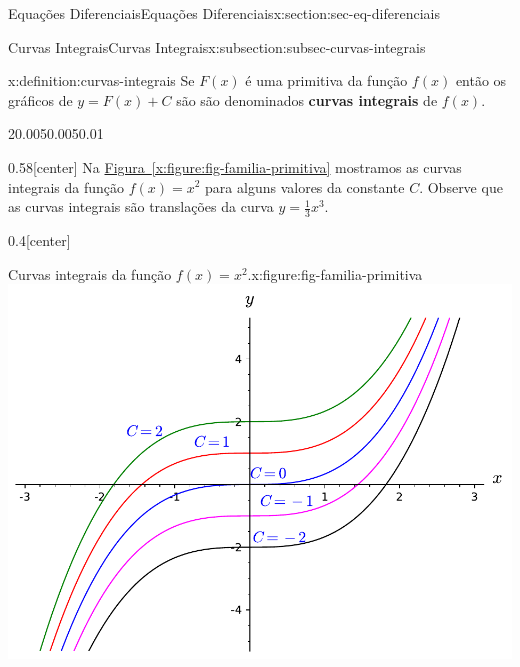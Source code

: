 \documentclass[oneside,10pt,]{article}
\newcommand{\xreffont}{\relax}
\newcommand{\terminology}[1]{\textbf{#1}}
\numberwithin{equation}{section}
\begin{document}
\begin{sectionptx}{Equações Diferenciais}{}{Equações Diferenciais}{}{}{x:section:sec-eq-diferenciais}
%
%
\typeout{************************************************}
\typeout{************************************************}
%
\begin{subsectionptx}{Curvas Integrais}{}{Curvas Integrais}{}{}{x:subsection:subsec-curvas-integrais}
\begin{definition}{}{x:definition:curvas-integrais}%
Se \(F(x)\) é uma primitiva da função \(f(x)\) então os gráficos de \(y=F(x)+C\) são são denominados  \terminology{curvas integrais} de \(f(x)\).\end{definition}
\begin{sidebyside}{2}{0.005}{0.005}{0.01}%
\begin{sbspanel}{0.58}[center]%
Na \hyperref[x:figure:fig-familia-primitiva]{Figura~{\xreffont\ref{x:figure:fig-familia-primitiva}}} mostramos as curvas integrais da função \(f(x)=x^2\) para alguns valores da constante \(C\).  Observe que as curvas integrais são translações \footnotemark{} da curva \(y=\frac{1}{3}x^3\).%
\end{sbspanel}%
\begin{sbspanel}{0.4}[center]%
\begin{figureptx}{Curvas integrais da função \(f(x)=x^2\).}{x:figure:fig-familia-primitiva}{}%
%
{\includegraphics[width=\linewidth]{images/sageplot-primitivas.pdf}}%
\tcblower
\end{figureptx}%

\end{sbspanel}
\end{sidebyside}
\end{subsectionptx}
\end{sectionptx}
\end{document}

